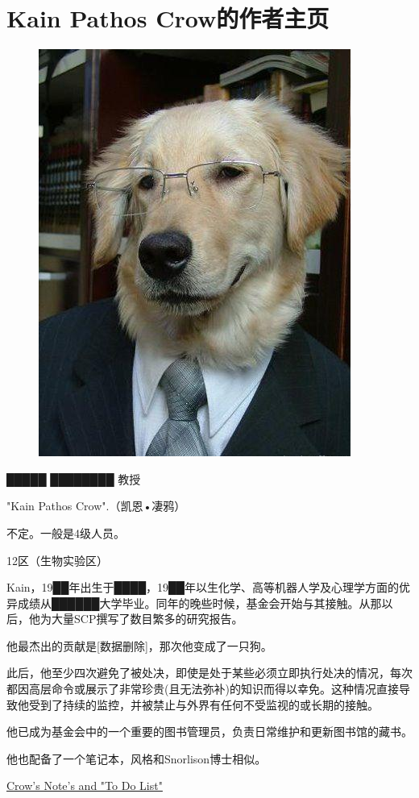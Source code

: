 \chapter{Kain Pathos Crow的作者主页}

\label{chap:AUTHOR-kain-pathos-crow}

\begin{figure}[H]
	\centering
	\includegraphics[width=0.5\linewidth]{images/AUTHOR.kain.pathos.crow.jpg}
	\caption*{\textsuperscript{}}
\end{figure}

█████ ████████ 教授

"Kain Pathos Crow".（凯恩•凄鸦）

不定。一般是4级人员。

12区（生物实验区）

Kain，19██年出生于████，19██年以生化学、高等机器人学及心理学方面的优异成绩从██████大学毕业。同年的晚些时候，基金会开始与其接触。从那以后，他为大量SCP撰写了数目繁多的研究报告。

他最杰出的贡献是{[}数据删除]，那次他变成了一只狗。

此后，他至少四次避免了被处决，即使是处于某些必须立即执行处决的情况，每次都因高层命令或展示了非常珍贵(且无法弥补)的知识而得以幸免。这种情况直接导致他受到了持续的监控，并被禁止与外界有任何不受监视的或长期的接触。

他已成为基金会中的一个重要的图书管理员，负责日常维护和更新图书馆的藏书。

他也配备了一个笔记本，风格和Snorlison博士相似。

\hyperref[chap:]{Crow's Note's and "To Do List"}

